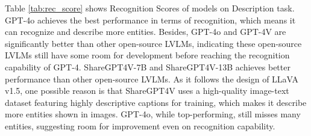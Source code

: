 Table \ref{tab:rec_score} shows Recognition Scores of models on Description task.
GPT-4o achieves the best performance in terms of recognition, which means it can recognize and describe more entities.
Besides, GPT-4o and GPT-4V are significantly better than other open-source LVLMs, indicating these open-source LVLMs still have some room for development before reaching the recognition capability of GPT-4.
ShareGPT4V-7B and ShareGPT4V-13B achieves better performance than other open-source LVLMs.
As it follows the design of LLaVA v1.5, one possible reason is that ShareGPT4V uses a high-quality image-text dataset featuring highly descriptive captions for training, which makes it describe more entities shown in images. 
GPT-4o, while top-performing, still misses many entities, suggesting room for improvement even on recognition capability.



